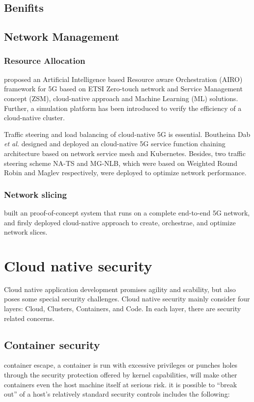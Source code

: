 \documentclass[12pt, draftclsnofoot, onecolumn]{IEEEtran}
\begin{document}
\subsection{Benifits}
\subsection{Network Management}
\subsubsection{Resource Allocation}
\cite{boudi2021ai} proposed an Artificial Intelligence based Resource aware Orchestration (AIRO) framework for 5G based on ETSI Zero-touch network and Service Management concept (ZSM), cloud-native approach and Machine Learning (ML) solutions. Further, a simulation platform has been introduced to verify the efficiency of a cloud-native cluster. 

Traffic steering and load balancing of cloud-native 5G is essential. Boutheina Dab \textit{et al.} designed and deployed an cloud-native 5G service function chaining architecture based on network service mesh\cite{NSM} and Kubernetes. Besides, two traffic steering scheme NA-TS\cite{dab2020efficient} and MG-NLB\cite{dab2020cloud}, which were based on Weighted Round Robin and Maglev\cite{eisenbud2016maglev} respectively, were deployed to optimize network performance.


\subsubsection{Network slicing}
\cite{sharma2017cloud} built an proof-of-concept system that runs on a complete end-to-end 5G network, and firsly deployed cloud-native approach to create, orchestrae, and optimize network slices.


\section{Cloud native security}
Cloud native application development promises agility and scability, but also poses some special security challenges. Cloud native security mainly consider four layers: Cloud, Clusters, Containers, and Code\cite{security}. In each layer, there are security related concerns.

\subsection{Container security}
container escape, a container is run with excessive privileges or punches holes through the security protection offered by kernel capabilities, will make other containers even the host machine itself at serious risk. it is possible to “break out” of a host’s relatively standard security controls includes the following:
\end{document}
